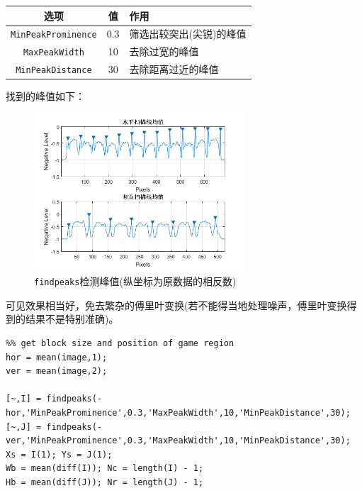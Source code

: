 \documentclass{article}
\numberwithin{figure}{section}
\numberwithin{table}{section}
\numberwithin{listing}{section}
\numberwithin{equation}{section}
\begin{document}
\begin{enumerate}
\begin{table}[H]
                    \begin{tabular}{c|c|l}
                    \hline
                
                    \hline
                    \textbf{选项} & \textbf{值} & \textbf{作用} \\
                    \hline
                        \texttt{MinPeakProminence} & 0.3 & 筛选出较突出(尖锐)的峰值 \\
                    \hline
                        \texttt{MaxPeakWidth} & 10 & 去除过宽的峰值 \\
                    \hline
                        \texttt{MinPeakDistance} & 30 & 去除距离过近的峰值 \\
                    \hline
                
                    \hline
                    \end{tabular}
                \end{table}

                找到的峰值如下：

                \begin{figure}[H]
                    \centering
                    \includegraphics[width=0.7\textwidth]{findpeaks}
                    \caption{\texttt{findpeaks}检测峰值(纵坐标为原数据的相反数)}
                \end{figure}

                可见效果相当好，免去繁杂的傅里叶变换(若不能得当地处理噪声，傅里叶变换得到的结果不是特别准确)。

                \begin{verbatim}
%% get block size and position of game region
hor = mean(image,1);
ver = mean(image,2);

[~,I] = findpeaks(-hor,'MinPeakProminence',0.3,'MaxPeakWidth',10,'MinPeakDistance',30);
[~,J] = findpeaks(-ver,'MinPeakProminence',0.3,'MaxPeakWidth',10,'MinPeakDistance',30);
Xs = I(1); Ys = J(1);
Wb = mean(diff(I)); Nc = length(I) - 1;
Hb = mean(diff(J)); Nr = length(J) - 1;
                \end{verbatim}


\end{enumerate}
\end{document}
